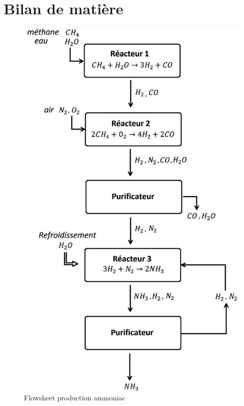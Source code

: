 \documentclass[11pt,a4paper]{report}
\begin{document}
\section*{Bilan de matière}
\begin{figure}[ht!]
 \centering
 \includegraphics[scale=0.35]{flowsheet.jpg}
 \caption{Flowsheet production ammoniac}
 \label{scheme}
 
\end{figure}
\end{document}

